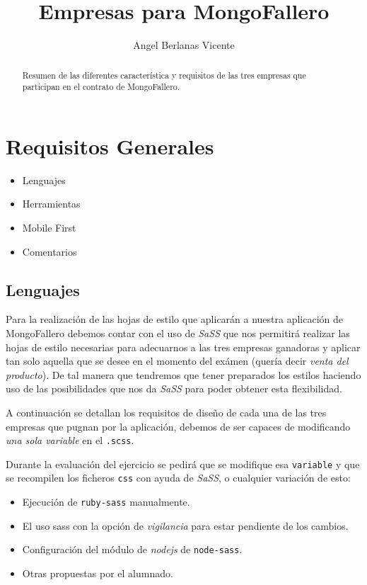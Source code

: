 \documentclass[a4paper,10pt]{article}
\title{Empresas para MongoFallero}
\author{Angel Berlanas Vicente}
\begin{document}
\maketitle

\begin{abstract}
Resumen de las diferentes característica y requisitos de las tres empresas que participan en el contrato de MongoFallero. 
\end{abstract}

\tableofcontents

\section{Requisitos Generales}

\begin{itemize}
    \item Lenguajes
    \item Herramientas
    \item Mobile First
    \item Comentarios
\end{itemize}

\subsection{Lenguajes}

Para la realización de las hojas de estilo que aplicarán a nuestra aplicación de MongoFallero debemos contar con el uso de \textit{SaSS} que nos permitirá realizar las hojas de estilo necesarias para adecuarnos a las tres empresas ganadoras y aplicar tan solo aquella que se desee en el momento del exámen (quería decir \textit{venta del producto}). De tal manera que tendremos que tener preparados los estilos haciendo uso de las posibilidades que nos da \textit{SaSS} para poder obtener esta flexibilidad.

A continuación se detallan los requisitos de diseño de cada una de las tres empresas que pugnan por la aplicación, debemos de ser capaces de modificando \textit{una sola variable} en el \texttt{.scss}.

Durante la evaluación del ejercicio se pedirá que se modifique esa \texttt{variable} y que se recompilen los ficheros \texttt{css} con ayuda de \textit{SaSS}, o cualquier variación de esto:

\begin{itemize}
\item Ejecución de \texttt{ruby-sass} manualmente.
\item El uso sass con la opción de \textit{vigilancia} para estar pendiente de los cambios.
\item Configuración del módulo de \textit{nodejs} de \texttt{node-sass}.
\item Otras propuestas por el alumnado.
\end{itemize}
\end{document}

